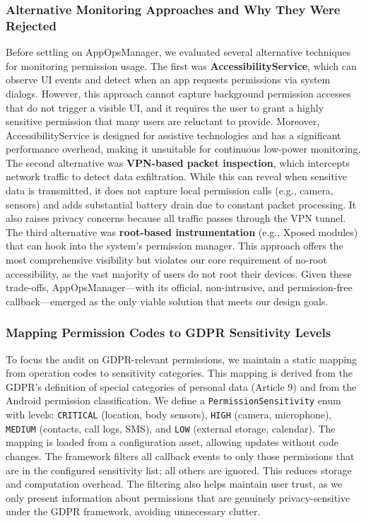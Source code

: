 \subsubsection{Alternative Monitoring Approaches and Why They Were Rejected}

Before settling on AppOpsManager, we evaluated several alternative techniques for monitoring permission usage. The first was \textbf{AccessibilityService}, which can observe UI events and detect when an app requests permissions via system dialogs. However, this approach cannot capture background permission accesses that do not trigger a visible UI, and it requires the user to grant a highly sensitive permission that many users are reluctant to provide. Moreover, AccessibilityService is designed for assistive technologies and has a significant performance overhead, making it unsuitable for continuous low-power monitoring. The second alternative was \textbf{VPN-based packet inspection}, which intercepts network traffic to detect data exfiltration. While this can reveal when sensitive data is transmitted, it does not capture local permission calls (e.g., camera, sensors) and adds substantial battery drain due to constant packet processing. It also raises privacy concerns because all traffic passes through the VPN tunnel. The third alternative was \textbf{root-based instrumentation} (e.g., Xposed modules) that can hook into the system's permission manager. This approach offers the most comprehensive visibility but violates our core requirement of no-root accessibility, as the vast majority of users do not root their devices. Given these trade-offs, AppOpsManager—with its official, non-intrusive, and permission-free callback—emerged as the only viable solution that meets our design goals.

\subsubsection{Mapping Permission Codes to GDPR Sensitivity Levels}

To focus the audit on GDPR-relevant permissions, we maintain a static mapping from operation codes to sensitivity categories. This mapping is derived from the GDPR's definition of special categories of personal data (Article 9) and from the Android permission classification. We define a \texttt{PermissionSensitivity} enum with levels: \texttt{CRITICAL} (location, body sensors), \texttt{HIGH} (camera, microphone), \texttt{MEDIUM} (contacts, call logs, SMS), and \texttt{LOW} (external storage, calendar). The mapping is loaded from a configuration asset, allowing updates without code changes. The framework filters all callback events to only those permissions that are in the configured sensitivity list; all others are ignored. This reduces storage and computation overhead. The filtering also helps maintain user trust, as we only present information about permissions that are genuinely privacy-sensitive under the GDPR framework, avoiding unnecessary clutter.

